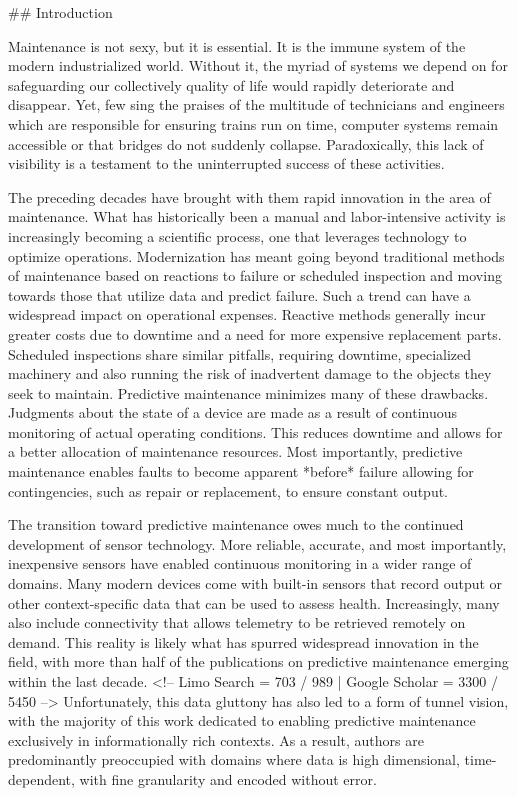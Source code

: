 ## Introduction

Maintenance is not sexy, but it is essential. It is the immune system of the modern industrialized world. Without it, the myriad of systems we depend on for safeguarding our collectively quality of life would rapidly deteriorate and disappear. Yet, few sing the praises of the multitude of technicians and engineers which are responsible for ensuring trains run on time, computer systems remain accessible or that bridges do not suddenly collapse. Paradoxically, this lack of visibility is a testament to the uninterrupted success of these activities. 

The preceding decades have brought with them rapid innovation in the area of maintenance. What has historically been a manual and labor-intensive activity is increasingly becoming a scientific process, one that leverages technology to optimize operations. Modernization has meant going beyond traditional methods of maintenance based on reactions to failure or scheduled inspection and moving towards those that utilize data and predict failure. Such a trend can have a widespread impact on operational expenses. Reactive methods generally incur greater costs due to downtime and a need for more expensive replacement parts. Scheduled inspections share similar pitfalls, requiring downtime, specialized machinery and also running the risk of inadvertent damage to the objects they seek to maintain. Predictive maintenance minimizes many of these drawbacks. Judgments about the state of a device are made as a result of continuous monitoring of actual operating conditions\cite{Mobley2002}. This reduces downtime and allows for a better allocation of maintenance resources. Most importantly, predictive maintenance enables faults to become apparent *before* failure allowing for contingencies, such as repair or replacement, to ensure constant output.


The transition toward predictive maintenance owes much to the continued development of sensor technology. More reliable, accurate, and most importantly, inexpensive sensors have enabled continuous monitoring in a wider range of domains. Many modern devices come with built-in sensors that record output or other context-specific data that can be used to assess health. Increasingly, many also include connectivity that allows telemetry to be retrieved remotely on demand. This reality is likely what has spurred widespread innovation in the field, with more than half of the publications on predictive maintenance emerging within the last decade. <!-- Limo Search = 703 / 989 | Google Scholar = 3300 / 5450 --> Unfortunately, this data gluttony has also led to a form of tunnel vision, with the majority of this work dedicated to enabling predictive maintenance exclusively in informationally rich contexts. As a result, authors are predominantly preoccupied with domains where data is high dimensional, time-dependent, with fine granularity and encoded without error. 


